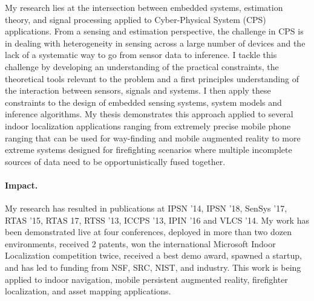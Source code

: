 \documentclass[10pt]{article}
\begin{document}
My research lies at the intersection between embedded systems, estimation theory, and signal processing applied to Cyber-Physical System (CPS) applications.  From a sensing and estimation perspective, the challenge in CPS is in dealing with heterogeneity in sensing across a large number of devices and the lack of a systematic way to go from sensor data to inference. I tackle this challenge by developing an understanding of the practical constraints, the theoretical tools relevant to the problem and a first principles understanding of the interaction between sensors, signals and systems. I then apply these constraints to the design of embedded sensing systems, system models and inference algorithms. My thesis demonstrates this approach applied to several indoor localization applications ranging from extremely precise mobile phone ranging that can be used for way-finding and mobile augmented reality to more extreme systems designed for firefighting scenarios where multiple incomplete sources of data need to be opportunistically fused together.  


\paragraph{Impact. }
My research has resulted in publications at IPSN '14, IPSN '18, SenSys '17, RTAS '15, RTAS 
17, RTSS '13, ICCPS '13, IPIN '16 and VLCS '14. My work has been demonstrated live at four conferences, deployed in more than two dozen environments, received 2 patents, won the international Microsoft Indoor Localization competition twice, received a best demo award, spawned a startup, and has led to funding from NSF, SRC, NIST, and industry. This work is being applied to indoor navigation, mobile persistent augmented reality, firefighter localization, and asset mapping applications.
\end{document}
